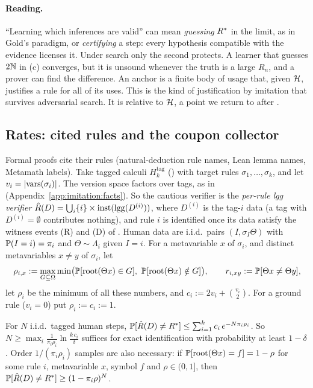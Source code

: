 \paragraph{Reading.} ``Learning which inferences are valid'' can mean \emph{guessing} $R^{*}$ in the limit, as in Gold's paradigm, or \emph{certifying} a step: every hypothesis compatible with the evidence licenses it. Under search only the second protects. A learner that guesses $2\mathbb{N}$ in (c) converges, but it is unsound whenever the truth is a large $R_n$, and a prover can find the difference. An anchor is a finite body of usage that, given $\mathcal{H}$, justifies a rule for all of its uses. This is the kind of justification by imitation that survives adversarial search. It is relative to $\mathcal{H}$, a point we return to after .

\subsection{Rates: cited rules and the coupon collector}\label{sec:imitation:rates}

Formal proofs cite their rules (natural-deduction rule names, Lean lemma names, Metamath labels). Take tagged calculi $H^{\mathrm{tag}}_k$ () with target rules $\sigma_1,\dots,\sigma_k$, and let $v_i=|\mathrm{vars}(\sigma_i)|$. The version space factors over tags, as in  (Appendix~\ref{app:imitation:facts}). So the cautious verifier is the \emph{per-rule lgg verifier} $\hat R(D)=\bigcup_i\{i\}\times\mathrm{inst}(\mathrm{lgg}(D^{(i)}))$, where $D^{(i)}$ is the tag-$i$ data (a tag with $D^{(i)}=\emptyset$ contributes nothing), and rule $i$ is identified once its data satisfy the witness events (R) and (D) of . Human data are i.i.d.\ pairs $(I,\sigma_I\Theta)$ with $\mathbb{P}(I=i)=\pi_i$ and $\Theta\sim\Lambda_i$ given $I=i$. For a metavariable $x$ of $\sigma_i$, and distinct metavariables $x\neq y$ of $\sigma_i$, let
\[
\rho_{i,x}:=\max_{G\subseteq\Omega}\min\bigl(\mathbb{P}[\mathrm{root}(\Theta x)\in G],\ \mathbb{P}[\mathrm{root}(\Theta x)\notin G]\bigr),\qquad r_{i,xy}:=\mathbb{P}[\Theta x\neq\Theta y],
\]
let $\rho_i$ be the minimum of all these numbers, and $c_i:=2v_i+\binom{v_i}2$. For a ground rule ($v_i=0$) put $\rho_i:=c_i:=1$.

\begin{theorem}\label{thm:imitation:coupon}
For $N$ i.i.d.\ tagged human steps, $\mathbb{P}[\hat R(D)\neq R^{*}]\le\sum_{i=1}^kc_i\,e^{-N\pi_i\rho_i}$. So $N\ge\max_i\frac1{\pi_i\rho_i}\ln\frac{k\,c_i}{\delta}$ suffices for exact identification with probability at least $1-\delta$. Order $1/(\pi_i\rho_i)$ samples are also necessary: if $\mathbb{P}[\mathrm{root}(\Theta x)=f]=1-\rho$ for some rule $i$, metavariable $x$, symbol $f$ and $\rho\in(0,1]$, then $\mathbb{P}[\hat R(D)\neq R^{*}]\ge(1-\pi_i\rho)^N$.
\end{theorem}

